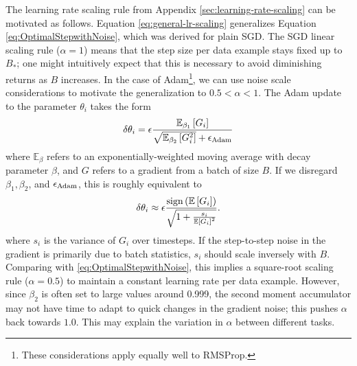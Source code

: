 \documentclass[english]{article}
\begin{document}
The learning rate scaling rule from Appendix \ref{sec:learning-rate-scaling} can be motivated as follows.  Equation \ref{eq:general-lr-scaling} generalizes Equation \ref{eq:OptimalStepwithNoise}, which was derived for plain SGD. The SGD linear scaling rule ($\alpha=1$) means that the step size per data example stays fixed up to $B_{\ast}$; one might intuitively expect that this is necessary to avoid diminishing returns as $B$ increases. In the case of Adam\footnote{These considerations apply equally well to RMSProp.}, we can use noise scale considerations to motivate the generalization to $0.5<\alpha<1$. The Adam update to the parameter $\theta_{i}$ takes the form
\[
\delta\theta_{i}=\epsilon\frac{\mathbb{E}_{\beta_{1}}\left[G_{i}\right]}{\sqrt{\mathbb{E}_{\beta_{2}}\left[G_{i}^{2}\right]}+\epsilon_{{\rm Adam}}}
\]
where $\mathbb{E}_{\beta}$ refers to an exponentially-weighted moving average with decay parameter $\beta$, and $G$ refers to a gradient from a batch of size $B$. If we disregard $\beta_{1},\beta_{2}$, and $\epsilon_{{\rm Adam}}$, this is roughly equivalent to
\[
\delta\theta_{i}\approx\epsilon\frac{{\rm sign}\left(\mathbb{E}\left[G_{i}\right]\right)}{\sqrt{1+\frac{s_{i}}{\mathbb{E}\left[G_{i}\right]^{2}}}}.
\]
where $s_{i}$ is the variance of $G_{i}$ over timesteps. If the step-to-step noise in the gradient is primarily due to batch statistics, $s_{i}$ should scale inversely with $B$. Comparing with \ref{eq:OptimalStepwithNoise}, this implies a square-root scaling rule ($\alpha=0.5$) to maintain a constant learning rate per data example. However, since $\beta_{2}$ is often set to large values around 0.999, the second moment accumulator may not have time to adapt to quick changes in the gradient noise; this pushes $\alpha$ back towards $1.0$. This may explain the variation in $\alpha$ between different tasks.
\end{document}
